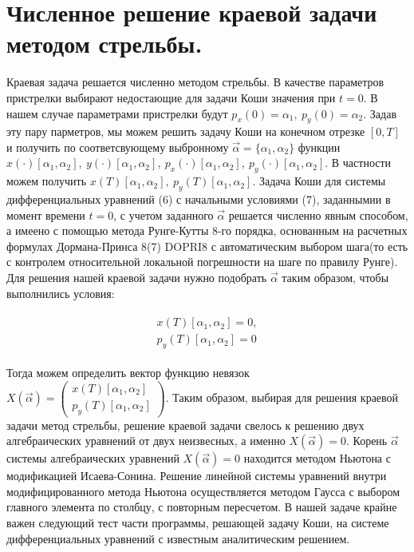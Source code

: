 \documentclass[a4paper,12pt]{article}
\begin{document}
\section{Численное решение краевой задачи методом стрельбы.}
Краевая задача решается численно методом стрельбы. В качестве параметров пристрелки выбирают недостающие для задачи Коши значения при $t=0$. В нашем случае параметрами пристрелки будут $p_x(0)=\alpha_1,\:p_y(0)=\alpha_2$. Задав эту пару парметров, мы можем решить задачу Коши на конечном отрезке $\left[0,T\right]$ и получить по соответсвующему выбронному $\overrightarrow{\alpha}=\{\alpha_1,\alpha_2\} $ функции 
$
x(\cdot)\left[\alpha_1,\alpha_2\right],\:
y(\cdot)\left[\alpha_1,\alpha_2\right],\:
p_x(\cdot)\left[\alpha_1,\alpha_2\right],\:
p_y(\cdot)\left[\alpha_1,\alpha_2\right]
$. В частности можем получить 
$
x(T)\left[\alpha_1,\alpha_2\right],\:
p_y(T)\left[\alpha_1,\alpha_2\right]
$.
Задача Коши для системы дифференциальных уравнений (6) с начальными условиями (7), заданнымии в момент времени $t=0$, с учетом заданного $\overrightarrow{\alpha}$ решается численно явным способом, а имеено с помощью метода Рунге-Кутты 8-го порядка, основанным на расчетных формулах Дормана-Принса 8(7) DOPRI8 с автоматическим выбором шага(то есть с контролем относительной локальной погрешности на шаге по правилу Рунге). Для решения нашей краевой задачи нужно подобрать $\overrightarrow{\alpha}$ таким образом, чтобы выполнились условия:

\begin{align}
\begin{align*}
x(T)\left[\alpha_1,\alpha_2\right]=0,\\
p_y(T)\left[\alpha_1,\alpha_2\right]=0
\end{align*}
\end{align}

Тогда можем определить вектор функцию невязок 
$
X(\overrightarrow{\alpha})=
\begin{pmatrix}
    x(T)\left[\alpha_1,\alpha_2\right]\\
    p_y(T)\left[\alpha_1,\alpha_2\right]
\end{pmatrix}$.
Таким образом, выбирая для решения краевой задачи метод стрельбы, решение краевой задачи свелось к решению двух алгебраических уравнений от двух неизвесных, а именно 
$
X(\overrightarrow{\alpha})=0
$.
Корень $\overrightarrow{\alpha}$ системы алгебраических уравнений $X(\overrightarrow{\alpha})=0$ находится методом Ньютона с модификацией Исаева-Сонина. Решение линейной системы уравнений внутри модифицированного метода Ньютона осуществляется методом Гаусса с выбором главного элемента по столбцу, с повторным пересчетом.
В нашей задаче крайне важен следующий тест части программы, решающей задачу Коши, на системе дифференциальных уравнений с известным аналитическим решением.
\end{document}
